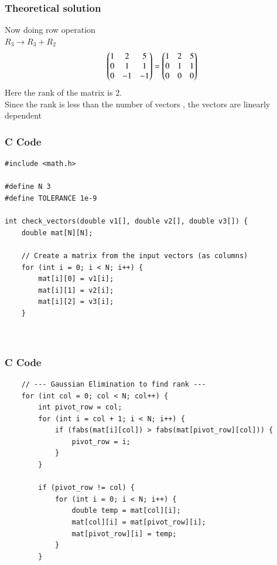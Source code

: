 \documentclass{beamer}
\begin{document}
    \begin{frame}
    \frametitle{Theoretical solution}
 Now doing row operation\\
$R_3\longrightarrow R_3+R_2$
\begin{align}
   \begin{pmatrix}1&2&5\\0&1&1\\0&-1&-1\end{pmatrix}= \begin{pmatrix}1&2&5\\0&1&1\\0&0&0\end{pmatrix}
\end{align}
Here the rank of the matrix is 2.\\
Since the rank is less than the number of vectors , the vectors are linearly dependent




    \end{frame}


    
   
    \begin{frame}[fragile]
        \frametitle{C Code}
        \begin{lstlisting}
#include <math.h>

#define N 3
#define TOLERANCE 1e-9

int check_vectors(double v1[], double v2[], double v3[]) {
    double mat[N][N];
    
    // Create a matrix from the input vectors (as columns)
    for (int i = 0; i < N; i++) {
        mat[i][0] = v1[i];
        mat[i][1] = v2[i];
        mat[i][2] = v3[i];
    }
    
   
        \end{lstlisting}
    \end{frame}
    
    \begin{frame}[fragile]
        \frametitle{C Code}
        \begin{lstlisting}
    // --- Gaussian Elimination to find rank ---
    for (int col = 0; col < N; col++) {
        int pivot_row = col;
        for (int i = col + 1; i < N; i++) {
            if (fabs(mat[i][col]) > fabs(mat[pivot_row][col])) {
                pivot_row = i;
            }
        }
        
        if (pivot_row != col) {
            for (int i = 0; i < N; i++) {
                double temp = mat[col][i];
                mat[col][i] = mat[pivot_row][i];
                mat[pivot_row][i] = temp;
            }
        }

        
        \end{lstlisting}
    \end{frame}
\end{document}
